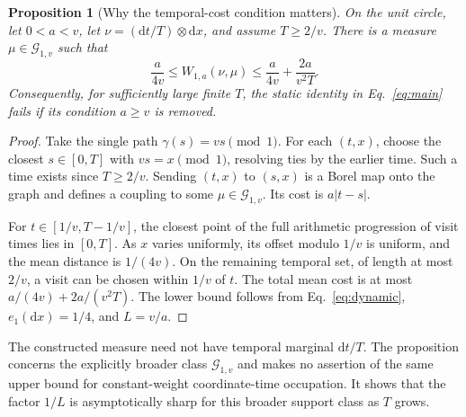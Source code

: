 \documentclass[aip,jmp,reprint,onecolumn,amsmath,amssymb]{revtex4-2}
\newcommand{\dd}{\mathrm{d}}
\newcommand{\G}{\mathcal G}
\newtheorem{proposition}[theorem]{Proposition}
\theoremstyle{definition}
\begin{document}
\begin{proposition}[Why the temporal-cost condition matters]
On the unit circle, let $0<a<v$, let $\nu=(\dd t/T)\otimes\dd x$, and assume $T\ge2/v$. There is a measure $\mu\in\G_{1,v}$ such that
\begin{equation}
 \frac{a}{4v}\le W_{1,a}(\nu,\mu)
 \le\frac{a}{4v}+\frac{2a}{v^2T}.
 \label{eq:cheap-time}
\end{equation}
Consequently, for sufficiently large finite $T$, the static identity in Eq.~\eqref{eq:main} fails if its condition $a\ge v$ is removed.
\end{proposition}
\begin{proof}
Take the single path $\gamma(s)=vs\pmod1$. For each $(t,x)$, choose the closest $s\in[0,T]$ with $vs=x\pmod1$, resolving ties by the earlier time. Such a time exists since $T\ge2/v$. Sending $(t,x)$ to $(s,x)$ is a Borel map onto the graph and defines a coupling to some $\mu\in\G_{1,v}$. Its cost is $a|t-s|$.

For $t\in[1/v,T-1/v]$, the closest point of the full arithmetic progression of visit times lies in $[0,T]$. As $x$ varies uniformly, its offset modulo $1/v$ is uniform, and the mean distance is $1/(4v)$. On the remaining temporal set, of length at most $2/v$, a visit can be chosen within $1/v$ of $t$. The total mean cost is at most $a/(4v)+2a/(v^2T)$. The lower bound follows from Eq.~\eqref{eq:dynamic}, $e_1(\dd x)=1/4$, and $L=v/a$.
\end{proof}
The constructed measure need not have temporal marginal $\dd t/T$. The proposition concerns the explicitly broader class $\G_{1,v}$ and makes no assertion of the same upper bound for constant-weight coordinate-time occupation. It shows that the factor $1/L$ is asymptotically sharp for this broader support class as $T$ grows.
\end{document}
